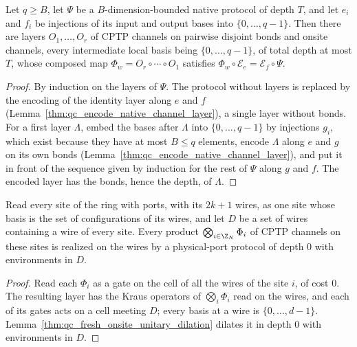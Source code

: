 \begin{lemma}
    \label{thm:qc_fixed_register_word}
    \leanok
    Let $q\ge B$, let $\Psi$ be a $B$-dimension-bounded native protocol of depth $T$, and let
    $e_i$ and $f_i$ be injections of its input and output bases into $\{0,\dots,q-1\}$. Then
    there are layers $O_1,\dots,O_r$ of CPTP channels on pairwise disjoint bonds and onsite
    channels, every intermediate local basis being $\{0,\dots,q-1\}$, of total depth at most
    $T$, whose composed map $\Phi_w=O_r\circ\cdots\circ O_1$ satisfies
    $\Phi_w\circ\mathcal E_e=\mathcal E_f\circ\Psi$.
\end{lemma}
\begin{proof}
    \leanok
    By induction on the layers of $\Psi$. The protocol without layers is replaced by the encoding
    of the identity layer along $e$ and $f$ (Lemma~\ref{thm:qc_encode_native_channel_layer}), a
    single layer without bonds. For a first layer $\Lambda$, embed the bases after $\Lambda$ into
    $\{0,\dots,q-1\}$ by injections $g_i$, which exist because they have at most $B\le q$
    elements, encode $\Lambda$ along $e$ and $g$ on its own bonds
    (Lemma~\ref{thm:qc_encode_native_channel_layer}), and put it in front of the sequence given
    by induction for the rest of $\Psi$ along $g$ and $f$. The encoded layer has the bonds, hence
    the depth, of $\Lambda$.
\end{proof}

\begin{lemma}
    \label{lem:qc_whole_site_channels}
    \leanok
    Read every site of the ring with ports, with its $2k+1$ wires, as one site whose basis is
    the set of configurations of its wires, and let $D$ be a set of wires containing a wire of
    every site. Every product $\bigotimes_{i\in\Z_N}\Phi_i$ of CPTP channels on these sites is
    realized on the wires by a physical-port protocol of depth $0$ with environments in $D$.
\end{lemma}
\begin{proof}
    \leanok
    Read each $\Phi_i$ as a gate on the cell of all the wires of the site $i$, of cost $0$.
    The resulting layer has the Kraus operators of $\bigotimes_i\Phi_i$ read on the wires, and
    each of its gates acts on a cell meeting $D$; every basis at a wire is
    $\{0,\dots,d-1\}$. Lemma~\ref{thm:qc_fresh_onsite_unitary_dilation} dilates it in depth $0$
    with environments in $D$.
\end{proof}

